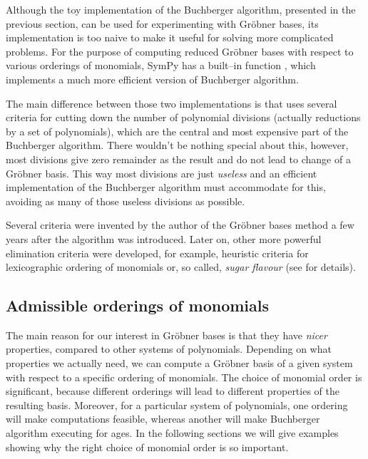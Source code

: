 Although the toy implementation of the Buchberger algorithm, presented in the previous section, can
be used for experimenting with Gröbner bases, its implementation is too naive to make it useful
for solving more complicated problems. For the purpose of computing reduced Gröbner bases with
respect to various orderings of monomials, SymPy has a built--in function , which
implements a much more efficient version of Buchberger algorithm.

The main difference between those two implementations is that  uses several criteria
for cutting down the number of polynomial divisions (actually reductions by a set of polynomials), which
are the central and most expensive part of the Buchberger algorithm. There wouldn't be nothing special
about this, however, most divisions give zero remainder as the result and do not lead to change of
a Gröbner basis. This way most divisions are just \emph{useless} and an efficient implementation of the
Buchberger algorithm must accommodate for this, avoiding as many of those useless divisions as possible.

Several criteria were invented by the author of the Gröbner bases method a few years after the
algorithm was introduced. Later on, other more powerful elimination criteria were developed, for
example, heuristic criteria for lexicographic ordering of monomials \cite{Czapor1991heuristic} or, so
called, \emph{sugar flavour} (see \cite{Giovini1991sugar} for details).
\hypertarget{thesis-orderings}{}

\subsection{Admissible orderings of monomials}

The main reason for our interest in Gröbner bases is that they have \emph{nicer} properties, compared
to other systems of polynomials. Depending on what properties we actually need, we can compute a
Gröbner basis of a given system with respect to a specific ordering of monomials. The choice of
monomial order is significant, because different orderings will lead to different properties of the
resulting basis. Moreover, for a particular system of polynomials, one ordering will make computations
feasible, whereas another will make Buchberger algorithm executing for ages. In the following sections
we will give examples showing why the right choice of monomial order is so important.

